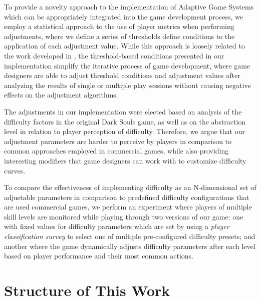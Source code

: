 To provide a novelty approach to the implementation of Adaptive Game Systems which can be appropriately integrated into the game development process, we employ a statistical approach to the use of player metrics when performing adjustments, where we define a series of thresholds define conditions to the application of each adjustment value. While this approach is loosely related to the work developed in \cite{article_casefordda}, the threshold-based conditions presented in our implementation simplify the iterative process of game development, where game designers are able to adjust threshold conditions and adjustment values after analyzing the results of single or multiple play sessions without causing negative effects on the adjustment algorithms.

The adjustments in our implementation were elected based on analysis of the difficulty factors in the original Dark Souls game, as well as on the abstraction level in relation to player perception of difficulty. Therefore, we argue that our adjustment parameters are harder to perceive by players in comparison to common approaches employed in commercial games, while also providing interesting modifiers that game designers can work with to customize difficulty curves.

To compare the effectiveness of implementing difficulty as an N-dimensional set of adjustable parameters in comparison to predefined difficulty configurations that are used commercial games, we perform an experiment where players of multiple skill levels are monitored while playing through two versions of our game: one with fixed values for difficulty parameters which are set by using a \emph{player classification survey} to select one of multiple pre-configured difficulty presets; and another where the game dynamically adjusts difficulty parameters after each level based on player performance and their most common actions.


\section{Structure of This Work}







